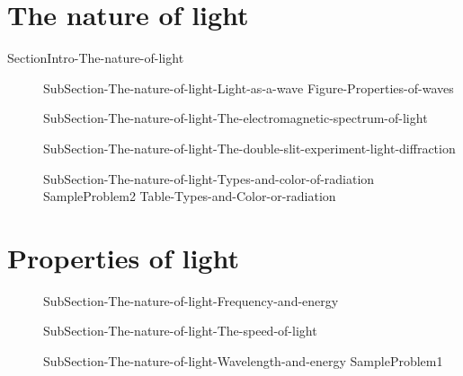 \documentclass[main.tex]{subfiles}
\newcommand\chapterlabel{Ch-radiation}\setcounter{figurenewcounter}{0}\setcounter{tablenewcounter}{0}\setcounter{formulanewcounter}{0}\chapterpicture{../{\chapterlabel}/figure1}\chapterpicturelabel{PngImg}
\begin{document}
\section{The nature of light}{SectionIntro-The-nature-of-light}
\sloppy\begin{description}
\item[]{SubSection-The-nature-of-light-Light-as-a-wave}
{Figure-Properties-of-waves}
\item[]{SubSection-The-nature-of-light-The-electromagnetic-spectrum-of-light}
\vspace{-1cm}{Figure-Electromagnetic-field}
\item[] {SubSection-The-nature-of-light-The-double-slit-experiment-light-diffraction}
\vspace{-1cm}{Figure-Double-slit}
\vspace{0cm}\hspace{-5cm}{Figure-waves-and-life}
\item[] {SubSection-The-nature-of-light-Types-and-color-of-radiation}
\hspace{0cm}\vspace{0cm}{Figure-Electromagnetic-spectra}
{SampleProblem2}
{Table-Types-and-Color-or-radiation}
\end{description}


\section{Properties of light} 
\sloppy\begin{description}
\item[] {SubSection-The-nature-of-light-Frequency-and-energy}
\item[] {SubSection-The-nature-of-light-The-speed-of-light}
\item[] {SubSection-The-nature-of-light-Wavelength-and-energy}
{SampleProblem1}
\end{description}
\end{document}
